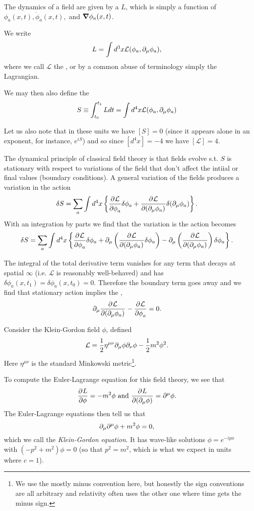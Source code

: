 The dynamics of a field are given by a  $L$, which is simply a function of $\phi_a(x,t), \dot \phi_a(x,t),$ and $\mbox{\boldmath$ \nabla $} \phi_a(x,t)$. 
\begin{defn}
We write
$$L=\int d^3 x \mathcal{L}(\phi_a, \partial_\mu \phi_a),$$
where we call $\mathcal{L}$ the , or by a common abuse of terminology simply the Lagrangian.
\end{defn}
\begin{defn}
We may then also define the 
$$S\equiv \int_{t_0}^{t_1}L dt = \int d^4x \mathcal{L}(\phi_a,\partial_\mu \phi_a)$$
\end{defn}
Let us also note that in these units we have $[S]=0$ (since it appears alone in an exponent, for instance, $e^{iS}$) and so since $[d^4x]=-4$ we have $[\mathcal{L}]=4.$

The dynamical principle of classical field theory is that fields evolve s.t. $S$ is stationary with respect to variations of the field that don't affect the intiial or final values (boundary conditions). A general variation of the fields produces a variation in the action
$$\delta S=\sum_a \int d^4 x\left \{ \frac{\partial^{} \mathcal{L}}{\partial \phi_a ^{}}\delta\phi_a +\frac{\partial^{} \mathcal{L}}{\partial (\partial_\mu\phi_a) ^{}} \delta(\partial_\mu \phi_a)\right\}.$$
With an integration by parts we find that the variation is the action becomes
$$\delta S= \sum_a \int d^4x \left\{ \frac{\partial^{} \mathcal{L}}{\partial \phi_a ^{}}\delta \phi_a +\partial_\mu \left( \frac{\partial^{} \mathcal{L}}{\partial (\partial_\mu \phi_a) ^{}}\delta \phi_a\right)-\partial_\mu \left(\frac{\partial^{} \mathcal{L}}{\partial (\partial_\mu \phi_a) ^{}}\right)\delta \phi_a\right\}.$$

The integral of the total derivative term vanishes for any term that decays at spatial $\infty$ (i.e. $\mathcal{L}$ is reasonably well-behaved) and has $\delta \phi_a(x,t_1)=\delta \phi_a(x,t_0)=0$. Therefore the boundary term goes away and we find that stationary action implies the ,
$$\partial_\mu\frac{\partial^{} \mathcal{L}}{\partial (\partial_\mu\phi_a) ^{}}-\frac{\partial^{} \mathcal{L}}{\partial \phi_a ^{}}=0.$$

\begin{exm}
Consider the Klein-Gordon field $\phi$, defined
$$\mathcal{L}=\frac{1}{2} \eta^{\mu\nu}\partial_\mu \phi \partial_\nu \phi -\frac{1}{2}m^2 \phi^2.$$
Here $\eta^{\mu\nu}$ is the standard Minkowski metric\footnote{We use the mostly minus convention here, but honestly the sign conventions are all arbitrary and relativity often uses the other one where time gets the minus sign.}.

To compute the Euler-Lagrange equation for this field theory, we see that $$\frac{\partial^{} L}{\partial \phi ^{}}=-m^2\phi \text{ and } \frac{\partial^{} L}{\partial (\partial_\mu \phi) ^{}}=\partial^\mu \phi.$$
The Euler-Lagrange equations then tell us that $$\partial_\mu \partial^\mu \phi+m^2\phi = 0,$$ which we call the \emph{Klein-Gordon equation}. It has wave-like solutions $\phi=e^{-ipx}$ with $(-p^2+m^2)\phi=0$ (so that $p^2=m^2$, which is what we expect in units where $c=1$).
\end{exm}